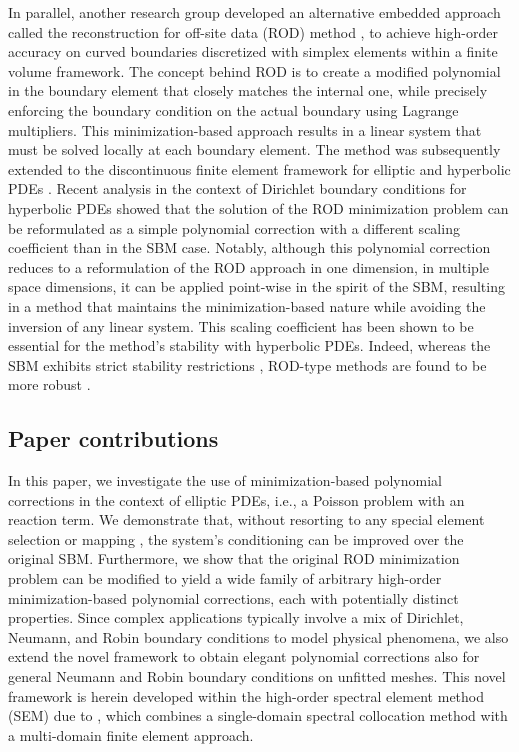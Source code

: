 \documentclass{article}
\begin{document}
In parallel, another research group developed an alternative embedded approach called the reconstruction for off-site data (ROD) method \cite{costa2018very,costa2019very}, to achieve high-order accuracy on curved boundaries discretized with simplex elements within a finite volume framework. The concept behind ROD is to create a modified polynomial in the boundary element that closely matches the internal one, while precisely enforcing the boundary condition on the actual boundary using Lagrange multipliers. This minimization-based approach results in a linear system that must be solved locally at each boundary element. The method was subsequently extended to the discontinuous finite element framework for elliptic and hyperbolic PDEs \cite{santos2024very,ciallella2024very}. Recent analysis in the context of Dirichlet boundary conditions for hyperbolic PDEs \cite{ciallella2025minimization} showed that the solution of the ROD minimization problem can be reformulated as a simple polynomial correction with a different scaling coefficient than in the SBM case. Notably, although this polynomial correction reduces to a reformulation of the ROD approach in one dimension, in multiple space dimensions, it can be applied point-wise in the spirit of the SBM, resulting in a method that maintains the minimization-based nature while avoiding the inversion of any linear system. This scaling coefficient has been shown to be essential for the method’s stability with hyperbolic PDEs. Indeed, whereas the SBM exhibits strict stability restrictions \cite{ciallella2025stability}, ROD-type methods are found to be more robust \cite{ciallella2025minimization}.\\


\subsection{Paper contributions}

In this paper, we investigate the use of minimization-based polynomial corrections in the context of elliptic PDEs, i.e., a Poisson problem with an reaction term. We demonstrate that, without resorting to any special element selection or mapping \cite{visbech2025spectral}, the system's conditioning can be improved over the original SBM. Furthermore, we show that the original ROD minimization problem can be modified to yield a wide family of arbitrary high-order minimization-based polynomial corrections, each with potentially distinct properties. Since complex applications typically involve a mix of Dirichlet, Neumann, and Robin boundary conditions to model physical phenomena, we also extend the novel framework to obtain elegant polynomial corrections also for general Neumann and Robin boundary conditions on unfitted meshes. This novel framework is herein developed within the high-order spectral element method (SEM) due to \cite{patera1984spectral}, which combines a single-domain spectral collocation method with a multi-domain finite element approach. 
\end{document}
